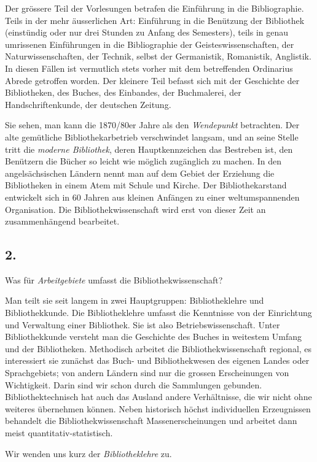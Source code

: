 \documentclass[a4paper,
fontsize=11pt,
oneside,
numbers=noperiodatend,
parskip=half-,
bibliography=totoc,
final
]{scrartcl}
\begin{document}
Der grössere Teil der Vorlesungen betrafen die Einführung in die
Bibliographie. Teils in der mehr äusserlichen Art: Einführung in die
Benützung der Bibliothek (einstündig oder nur drei Stunden zu Anfang des
Semesters), teils in genau umrissenen Einführungen in die Bibliographie
der Geisteswissenschaften, der Naturwissenschaften, der Technik, selbst
der Germanistik, Romanistik, Anglistik. In diesen Fällen ist vermutlich
stets vorher mit dem betreffenden Ordinarius Abrede getroffen worden.
Der kleinere Teil befasst sich mit der Geschichte der Bibliotheken, des
Buches, des Einbandes, der Buchmalerei, der Handschriftenkunde, der
deutschen Zeitung.

Sie sehen, man kann die 1870/80er Jahre als den \emph{Wendepunkt}
betrachten. Der alte gemütliche Bibliothekarbetrieb verschwindet
langsam, und an seine Stelle tritt die \emph{moderne Bibliothek}, deren
Hauptkennzeichen das Bestreben ist, den Benützern die Bücher so leicht
wie möglich zugänglich zu machen. In den angelsächsischen Ländern nennt
man auf dem Gebiet der Erziehung die Bibliotheken in einem Atem mit
Schule und Kirche. Der Bibliothekarstand entwickelt sich in 60 Jahren
aus kleinen Anfängen zu einer weltumspannenden Organisation. Die
Bibliothekwissenschaft wird erst von dieser Zeit an zusammenhängend
bearbeitet.

\subsection*{2.}

Was für \emph{Arbeitgebiete} umfasst die Bibliothekwissenschaft?

Man teilt sie seit langem in zwei Hauptgruppen: Bibliotheklehre und
Bibliothekkunde. Die Bibliotheklehre umfasst die Kenntnisse von der
Einrichtung und Verwaltung einer Bibliothek. Sie ist also
Betriebswissenschaft. Unter Bibliothekkunde versteht man die Geschichte
des Buches in weitestem Umfang und der Bibliotheken. Methodisch arbeitet
die Bibliothekwissenschaft regional, es interessiert sie zunächst das
Buch- und Bibliothekwesen des eigenen Landes oder Sprachgebiets; von
andern Ländern sind nur die grossen Erscheinungen von Wichtigkeit. Darin
sind wir schon durch die Sammlungen gebunden. Bibliothektechnisch hat
auch das Ausland andere Verhältnisse, die wir nicht ohne weiteres
übernehmen können. Neben historisch höchst individuellen Erzeugnissen
behandelt die Bibliothekwissenschaft Massenerscheinungen und arbeitet
dann meist quantitativ-statistisch.

Wir wenden uns kurz der \emph{Bibliotheklehre} zu.
\end{document}
